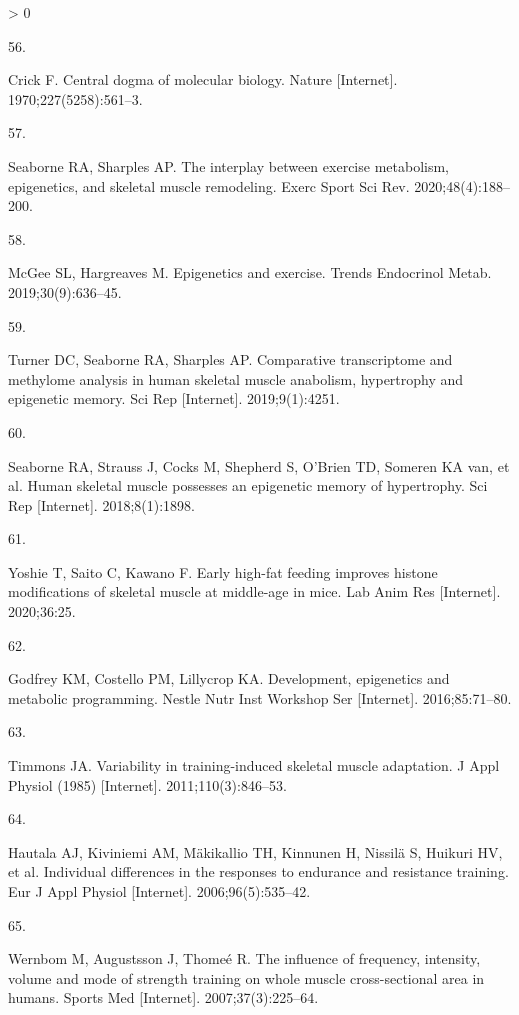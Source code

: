 \documentclass[twoside,10pt]{gihclass} %
\newlength{\cslhangindent}
\newlength{\csllabelwidth}
\newenvironment{CSLReferences}[3] %
 {%
  \setlength{\parindent}{0pt}
  \ifodd #1 \everypar{\setlength{\hangindent}{\cslhangindent}}\ignorespaces\fi
  \ifnum #2 > 0
  \setlength{\parskip}{#2\baselineskip}
  \fi
 }%
 {}
\newcommand{\CSLLeftMargin}[1]{\parbox[t]{\maxof{\widthof{#1}}{\csllabelwidth}}{#1}}
\newcommand{\CSLRightInline}[1]{\parbox[t]{\linewidth}{#1}}
\begin{document}
\begin{CSLReferences}{0}{0}
\leavevmode\hypertarget{ref-RN2692}{}%
\CSLLeftMargin{56. }
\CSLRightInline{Crick F. Central dogma of molecular biology. Nature {[}Internet{]}. 1970;227(5258):561--3. }

\leavevmode\hypertarget{ref-RN2690}{}%
\CSLLeftMargin{57. }
\CSLRightInline{Seaborne RA, Sharples AP. The interplay between exercise metabolism, epigenetics, and skeletal muscle remodeling. Exerc Sport Sci Rev. 2020;48(4):188--200. }

\leavevmode\hypertarget{ref-RN2691}{}%
\CSLLeftMargin{58. }
\CSLRightInline{McGee SL, Hargreaves M. Epigenetics and exercise. Trends Endocrinol Metab. 2019;30(9):636--45. }

\leavevmode\hypertarget{ref-RN2683}{}%
\CSLLeftMargin{59. }
\CSLRightInline{Turner DC, Seaborne RA, Sharples AP. Comparative transcriptome and methylome analysis in human skeletal muscle anabolism, hypertrophy and epigenetic memory. Sci Rep {[}Internet{]}. 2019;9(1):4251. }

\leavevmode\hypertarget{ref-RN2012}{}%
\CSLLeftMargin{60. }
\CSLRightInline{Seaborne RA, Strauss J, Cocks M, Shepherd S, O'Brien TD, Someren KA van, et al. Human skeletal muscle possesses an epigenetic memory of hypertrophy. Sci Rep {[}Internet{]}. 2018;8(1):1898. }

\leavevmode\hypertarget{ref-RN2694}{}%
\CSLLeftMargin{61. }
\CSLRightInline{Yoshie T, Saito C, Kawano F. Early high-fat feeding improves histone modifications of skeletal muscle at middle-age in mice. Lab Anim Res {[}Internet{]}. 2020;36:25. }

\leavevmode\hypertarget{ref-RN2695}{}%
\CSLLeftMargin{62. }
\CSLRightInline{Godfrey KM, Costello PM, Lillycrop KA. Development, epigenetics and metabolic programming. Nestle Nutr Inst Workshop Ser {[}Internet{]}. 2016;85:71--80. }

\leavevmode\hypertarget{ref-RN758}{}%
\CSLLeftMargin{63. }
\CSLRightInline{Timmons JA. Variability in training-induced skeletal muscle adaptation. J Appl Physiol (1985) {[}Internet{]}. 2011;110(3):846--53. }

\leavevmode\hypertarget{ref-RN2681}{}%
\CSLLeftMargin{64. }
\CSLRightInline{Hautala AJ, Kiviniemi AM, Mäkikallio TH, Kinnunen H, Nissilä S, Huikuri HV, et al. Individual differences in the responses to endurance and resistance training. Eur J Appl Physiol {[}Internet{]}. 2006;96(5):535--42. }

\leavevmode\hypertarget{ref-RN346}{}%
\CSLLeftMargin{65. }
\CSLRightInline{Wernbom M, Augustsson J, Thomeé R. The influence of frequency, intensity, volume and mode of strength training on whole muscle cross-sectional area in humans. Sports Med {[}Internet{]}. 2007;37(3):225--64. }


\end{CSLReferences}
\end{document}
